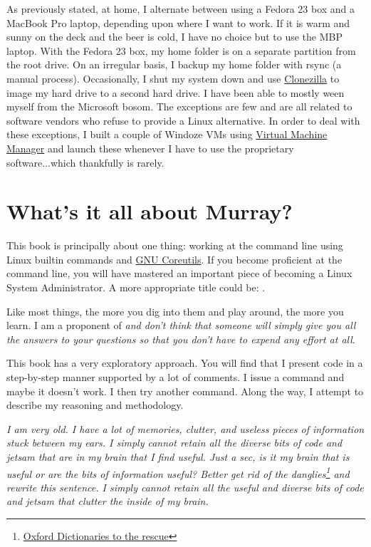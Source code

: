 As previously stated, at home, I alternate between using a Fedora 23 box and a MacBook Pro laptop, depending upon where I want to work. If it is warm and sunny on the deck and the beer is cold, I have no choice but to use the MBP laptop. With the Fedora 23 box, my home folder is on a separate partition from the root drive. On an irregular basis, I backup my home folder with rsync (a manual process). Occasionally, I shut my system down and use \href{http://clonezilla.org/downloads.php}{Clonezilla} to image my hard drive to a second hard drive. I have been able to mostly ween myself from the Microsoft bosom. The exceptions are few and are all related to software vendors who refuse to provide a Linux alternative. In order to deal with these exceptions, I built a couple of Windoze VMs using \href{http://virt-manager.ort}{Virtual Machine Manager} and launch these whenever I have to use the proprietary software...which thankfully is rarely.

\section{What's it all about Murray?}
\label{sec:allabout}

This book is principally about one thing: working at the command line using Linux builtin commands and \href{http://www.gnu.org/software/coreutils/coreutils.html}{GNU Coreutils}. If you become proficient at the command line, you will have mastered an important piece of becoming a Linux System Administrator. A more appropriate title could be:  .

Like most things, the more you dig into them and play around, the more you learn. I am a proponent of \textit{ and don't think that someone will simply give you all the answers to your questions so that you don't have to expend any effort at all}.

This book has a very exploratory approach. You will find that I present code in a step-by-step manner supported by a lot of comments. I issue a command and maybe it doesn't work. I then try another command. Along the way, I attempt to describe my reasoning and methodology.


\begin{addmargin}[1em]{2em}
\textit{I am very old. I have a lot of memories, clutter, and useless pieces of information stuck between my ears. I simply cannot retain all the diverse bits of code and jetsam that are in my brain that I find useful. Just a sec, is it my brain that is useful or are the bits of information useful? Better get rid of the danglies\footnote{\href{http://blog.oxforddictionaries.com/2011/09/participles-how-not-to-dangle/}{Oxford Dictionaries to the rescue}} and rewrite this sentence. I simply cannot retain all the useful and diverse bits of code and jetsam that clutter the inside of my brain.}
\end{addmargin}

